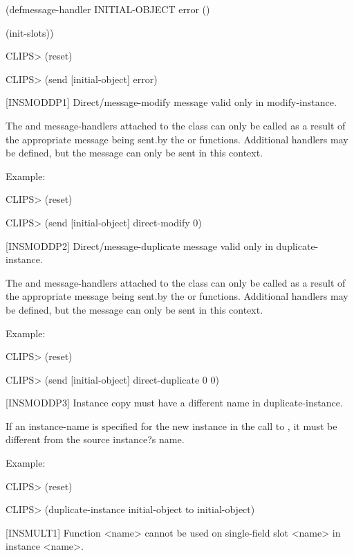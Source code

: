 \documentclass[letterpaper,10pt,english]{sphinxmanual}
\begin{document}
(defmessage-handler INITIAL-OBJECT error ()

(init-slots))

CLIPS\textgreater{} (reset)

CLIPS\textgreater{} (send {[}initial-object{]} error)

{[}INSMODDP1{]} Direct/message-modify message valid only in modify-instance.

The  and  message-handlers attached
to the class  can only be called as a result of the appropriate
message being sent.by the  or
 functions. Additional handlers may be
defined, but the message can only be sent in this context.

Example:

CLIPS\textgreater{} (reset)

CLIPS\textgreater{} (send {[}initial-object{]} direct-modify 0)

{[}INSMODDP2{]} Direct/message-duplicate message valid only in
duplicate-instance.

The  and  message-handlers
attached to the class  can only be called as a result of the
appropriate message being sent.by the  or
 functions. Additional handlers may be
defined, but the message can only be sent in this context.

Example:

CLIPS\textgreater{} (reset)

CLIPS\textgreater{} (send {[}initial-object{]} direct-duplicate 0 0)

{[}INSMODDP3{]} Instance copy must have a different name in
duplicate-instance.

If an instance-name is specified for the new instance in the call to
, it must be different from the source instance?s
name.

Example:

CLIPS\textgreater{} (reset)

CLIPS\textgreater{} (duplicate-instance initial-object to initial-object)

{[}INSMULT1{]} Function \textless{}name\textgreater{} cannot be used on single-field slot \textless{}name\textgreater{} in
instance \textless{}name\textgreater{}.
\end{document}
